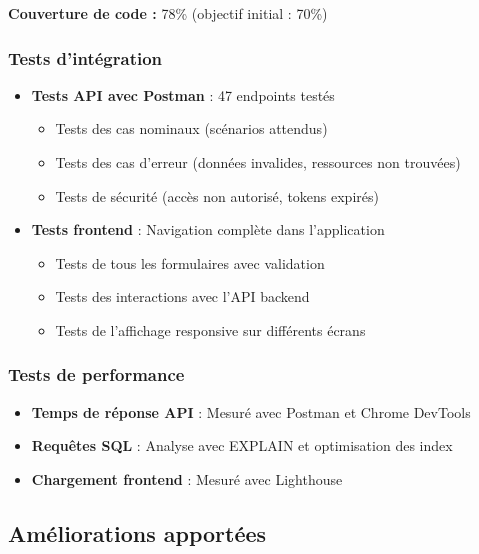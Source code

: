 \documentclass[12pt,a4paper]{report}
\begin{document}
\textbf{Couverture de code :} 78\% (objectif initial : 70\%)

\subsubsection{Tests d'intégration}

\begin{itemize}[leftmargin=1cm]
    \item \textbf{Tests API avec Postman} : 47 endpoints testés
    \begin{itemize}
        \item Tests des cas nominaux (scénarios attendus)
        \item Tests des cas d'erreur (données invalides, ressources non trouvées)
        \item Tests de sécurité (accès non autorisé, tokens expirés)
    \end{itemize}
    
    \item \textbf{Tests frontend} : Navigation complète dans l'application
    \begin{itemize}
        \item Tests de tous les formulaires avec validation
        \item Tests des interactions avec l'API backend
        \item Tests de l'affichage responsive sur différents écrans
    \end{itemize}
\end{itemize}

\subsubsection{Tests de performance}

\begin{itemize}[leftmargin=1cm]
    \item \textbf{Temps de réponse API} : Mesuré avec Postman et Chrome DevTools
    \item \textbf{Requêtes SQL} : Analyse avec EXPLAIN et optimisation des index
    \item \textbf{Chargement frontend} : Mesuré avec Lighthouse
\end{itemize}

\subsection{Améliorations apportées}
\end{document}
